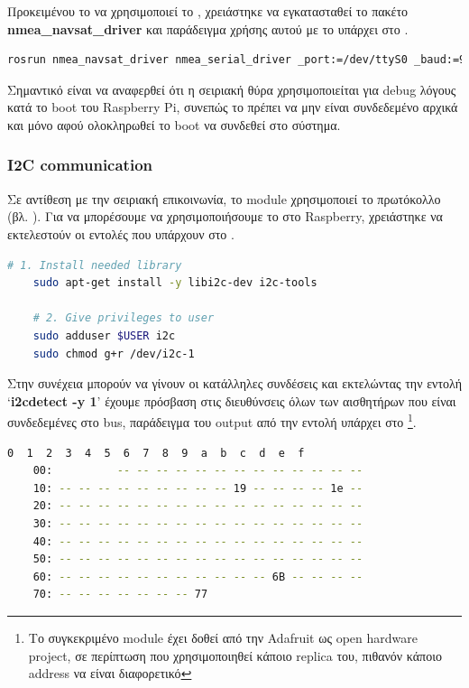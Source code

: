 Προκειμένου το  να χρησιμοποιεί το , χρειάστηκε να εγκατασταθεί το πακέτο \textbf{nmea\_navsat\_driver} \cite{nmea-navsat-driver} και παράδειγμα χρήσης αυτού με το  υπάρχει στο .  

\begin{lstlisting}[language=bash, escapechar=@, caption={GPS - ROS sample usage},label=list:gps-ros-sample-usage]
    rosrun nmea_navsat_driver nmea_serial_driver _port:=/dev/ttyS0 _baud:=9600 
\end{lstlisting}

Σημαντικό είναι να αναφερθεί ότι η σειριακή θύρα χρησιμοποιείται για debug λόγους κατά το boot
του Raspberry Pi, συνεπώς το  πρέπει να μην είναι συνδεδεμένο αρχικά και μόνο αφού ολοκληρωθεί το boot να συνδεθεί στο σύστημα.

\subsubsection{I2C communication}
Σε αντίθεση με την σειριακή επικοινωνία, το  module χρησιμοποιεί το  πρωτόκολλο (βλ. ).
Για να μπορέσουμε να χρησιμοποιήσουμε το  στο Raspberry, χρειάστηκε να εκτελεστούν οι εντολές που υπάρχουν στο .

\begin{lstlisting}[language=bash, escapechar=@, caption={Fix I2C communication},label=list:fix-I2C-communication]
    # 1. Install needed library
    sudo apt-get install -y libi2c-dev i2c-tools 

    # 2. Give privileges to user
    sudo adduser $USER i2c
    sudo chmod g+r /dev/i2c-1
\end{lstlisting}

Στην συνέχεια μπορούν να γίνουν οι κατάλληλες συνδέσεις και εκτελώντας την ε\-ντο\-λή `\textbf{i2cdetect -y 1}' έχουμε πρόσβαση στις διευθύνσεις όλων των αισθητήρων που είναι συνδεδεμένες στο  bus, παράδειγμα του output από την εντολή υπάρχει στο \footnote{Το συγκεκριμένο module έχει δοθεί από την Adafruit ως open hardware project, σε περίπτωση που χρησιμοποιηθεί κάποιο replica του, πιθανόν κάποιο address να είναι διαφορετικό}.

\begin{lstlisting}[language=bash, escapechar=@, caption={I2C addressed output example},label=list:I2C-output]
    0  1  2  3  4  5  6  7  8  9  a  b  c  d  e  f
    00:          -- -- -- -- -- -- -- -- -- -- -- -- -- 
    10: -- -- -- -- -- -- -- -- -- 19 -- -- -- -- 1e -- 
    20: -- -- -- -- -- -- -- -- -- -- -- -- -- -- -- -- 
    30: -- -- -- -- -- -- -- -- -- -- -- -- -- -- -- -- 
    40: -- -- -- -- -- -- -- -- -- -- -- -- -- -- -- -- 
    50: -- -- -- -- -- -- -- -- -- -- -- -- -- -- -- -- 
    60: -- -- -- -- -- -- -- -- -- -- -- 6B -- -- -- -- 
    70: -- -- -- -- -- -- -- 77       
\end{lstlisting}

